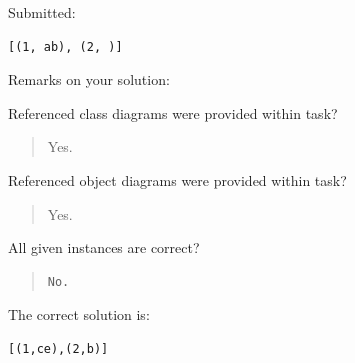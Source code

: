 Submitted:


\begin{verbatim}
[(1, ab), (2, )]
\end{verbatim}


Remarks on your solution:

Referenced class diagrams were provided within task?\begin{quote}Yes.\end{quote}Referenced object diagrams were provided within task?\begin{quote}Yes.\end{quote}All given instances are correct?

\begin{quote}
\begin{verbatim}
No.
\end{verbatim}
\end{quote}

The correct solution is:
\begin{verbatim}
[(1,ce),(2,b)]
\end{verbatim}


